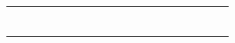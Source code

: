 \begin{center}
\begin{table}[]
\begin{tabular}{llllllllllllllllllll}
\multicolumn{1}{c}{}                                                   & \multicolumn{1}{c}{}                    & \multicolumn{1}{c}{}                    & \multicolumn{1}{c}{}                             & \multicolumn{1}{c}{}             &                                   &                                                    &  &  &  &  &  &  &  &  &  &  &  &  &  \\
\multicolumn{1}{c}{}                                                   & \multicolumn{1}{c}{}                    & \multicolumn{1}{c}{}                    & \multicolumn{1}{c}{}                             & \multicolumn{1}{c}{}             &                                   &                                                    &  &  &  &  &  &  &  &  &  &  &  &  &  \\
\multicolumn{1}{c}{}                                                   & \multicolumn{1}{c}{}                    & \multicolumn{1}{c}{}                    & \multicolumn{1}{c}{}                             & \multicolumn{1}{c}{}             &                                   &                                                    &  &  &  &  &  &  &  &  &  &  &  &  &  \\
\multicolumn{1}{c}{}                                                   & \multicolumn{1}{c}{}                    & \multicolumn{1}{c}{}                    & \multicolumn{1}{c}{}                             & \multicolumn{1}{c}{}             &                                   &                                                    &  &  &  &  &  &  &  &  &  &  &  &  &  \\
\multicolumn{1}{c}{}                                                   & \multicolumn{1}{c}{}                    & \multicolumn{1}{c}{}                    & \multicolumn{1}{c}{}                             & \multicolumn{1}{c}{}             &                                   &                                                    &  &  &  &  &  &  &  &  &  &  &  &  &  \\
\multicolumn{1}{c}{}                                                   & \multicolumn{1}{c}{}                    & \multicolumn{1}{c}{}                    & \multicolumn{1}{c}{}                             & \multicolumn{1}{c}{}             &                                   &                                                    &  &  &  &  &  &  &  &  &  &  &  &  &  \\
\multicolumn{1}{c}{}                                                   & \multicolumn{1}{c}{}                    & \multicolumn{1}{c}{}                    & \multicolumn{1}{c}{}                             & \multicolumn{1}{c}{}             &                                   &                                                    &  &  &  &  &  &  &  &  &  &  &  &  &  \\

\end{tabular}
\end{table}
\end{center}
